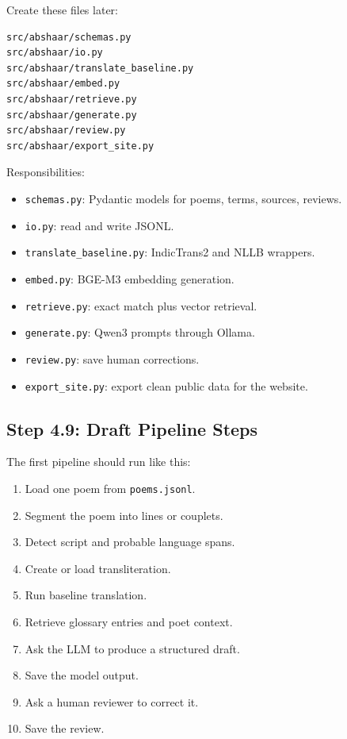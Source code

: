 \documentclass[11pt]{article}
\begin{document}
Create these files later:

\begin{verbatim}
src/abshaar/schemas.py
src/abshaar/io.py
src/abshaar/translate_baseline.py
src/abshaar/embed.py
src/abshaar/retrieve.py
src/abshaar/generate.py
src/abshaar/review.py
src/abshaar/export_site.py
\end{verbatim}

Responsibilities:

\begin{itemize}
  \item \verb|schemas.py|: Pydantic models for poems, terms, sources, reviews.
  \item \verb|io.py|: read and write JSONL.
  \item \verb|translate_baseline.py|: IndicTrans2 and NLLB wrappers.
  \item \verb|embed.py|: BGE-M3 embedding generation.
  \item \verb|retrieve.py|: exact match plus vector retrieval.
  \item \verb|generate.py|: Qwen3 prompts through Ollama.
  \item \verb|review.py|: save human corrections.
  \item \verb|export_site.py|: export clean public data for the website.
\end{itemize}

\subsection{Step 4.9: Draft Pipeline Steps}

The first pipeline should run like this:

\begin{enumerate}
  \item Load one poem from \verb|poems.jsonl|.
  \item Segment the poem into lines or couplets.
  \item Detect script and probable language spans.
  \item Create or load transliteration.
  \item Run baseline translation.
  \item Retrieve glossary entries and poet context.
  \item Ask the LLM to produce a structured draft.
  \item Save the model output.
  \item Ask a human reviewer to correct it.
  \item Save the review.
\end{enumerate}
\end{document}
